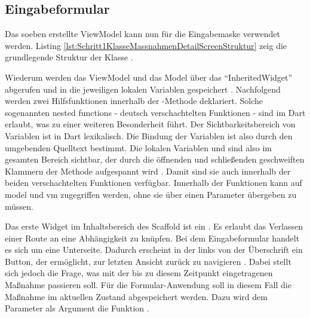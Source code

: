
\ifincludeall \clearpage \fi
\subsection{Eingabeformular}
  
Das soeben erstellte ViewModel kann nun für die Eingabemaske verwendet werden.
Listing \ref{lst:Schritt1KlasseMassnahmenDetailScreenStruktur} zeig die grundlegende Struktur der Klasse .

    
Wiederum werden das ViewModel und das Model über das \enquote{InheritedWidget}  abgerufen und in die jeweiligen lokalen Variablen gespeichert .
Nachfolgend werden zwei Hilfsfunktionen innerhalb der -Methode deklariert.
Solche sogenannten nested functions - deutsch
verschachtelten Funktionen - sind im Dart erlaubt, was zu einer weiteren Besonderheit führt.
Der Sichtbarkeitsbereich von Variablen ist in Dart lexikalisch.
Die Bindung der Variablen ist also durch den umgebenden Quelltext bestimmt.
Die lokalen Variablen  und  sind also im gesamten Bereich sichtbar, der durch die öffnenden und schließenden geschweiften Klammern der Methode  aufgespannt wird .
Damit sind sie auch innerhalb der beiden verschachtelten Funktionen verfügbar.
Innerhalb der Funktionen kann auf model und vm zugegriffen werden, ohne sie über einen Parameter übergeben zu müssen.


Das erste Widget im Inhaltsbereich des Scaffold ist ein .
Es erlaubt das Verlassen einer Route an eine Abhängigkeit zu knüpfen.
Bei dem Eingabeformular handelt es sich um eine Unterseite.
Dadurch erscheint in der   links von der Überschrift ein Button, der ermöglicht, zur letzten Ansicht zurück zu navigieren \Abb{\ref{fig:Schritt1Eingabemaske}}.
Dabei stellt sich jedoch die Frage, was mit der bis zu diesem Zeitpunkt eingetragenen Maßnahme passieren soll.
Für die Formular-Anwendung soll in diesem Fall die Maßnahme im aktuellen Zustand abgespeichert werden.
Dazu wird dem Parameter  als Argument die Funktion .



